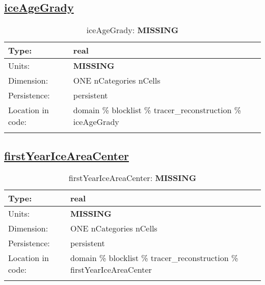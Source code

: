 \subsection[iceAgeGrady]{\hyperref[sec:var_tab_tracer_reconstruction]{iceAgeGrady}}
\label{subsec:var_sec_tracer_reconstruction_iceAgeGrady}
\begin{center}
\begin{longtable}{| p{2.0in} | p{4.0in} |}
        \hline 
        Type: & real \\
        \hline 
        Units: & {\bf \color{red} MISSING} \\
        \hline 
        Dimension: & ONE nCategories nCells \\
        \hline 
        Persistence: & persistent \\
        \hline 
         Location in code: & domain \% blocklist \% tracer\_reconstruction \% iceAgeGrady \\
         \hline 
    \caption{iceAgeGrady: {\bf \color{red} MISSING}}
\end{longtable}
\end{center}
\subsection[firstYearIceAreaCenter]{\hyperref[sec:var_tab_tracer_reconstruction]{firstYearIceAreaCenter}}
\label{subsec:var_sec_tracer_reconstruction_firstYearIceAreaCenter}
\begin{center}
\begin{longtable}{| p{2.0in} | p{4.0in} |}
        \hline 
        Type: & real \\
        \hline 
        Units: & {\bf \color{red} MISSING} \\
        \hline 
        Dimension: & ONE nCategories nCells \\
        \hline 
        Persistence: & persistent \\
        \hline 
         Location in code: & domain \% blocklist \% tracer\_reconstruction \% firstYearIceAreaCenter \\
         \hline 
    \caption{firstYearIceAreaCenter: {\bf \color{red} MISSING}}
\end{longtable}
\end{center}
